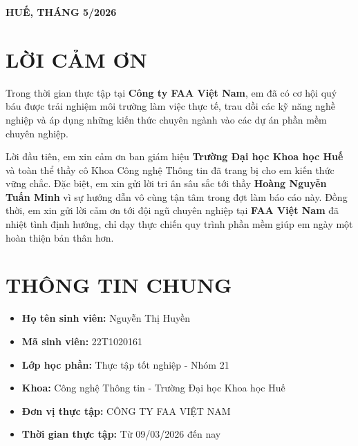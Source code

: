 \documentclass[12pt, a4paper]{article}
\begin{document}
\begin{titlepage}
    \vfill
    \begin{center}
        \textbf{HUẾ, THÁNG 5/2026}
    \end{center}
    \restoregeometry
\end{titlepage}

\newpage

\section*{LỜI CẢM ƠN}
Trong thời gian thực tập tại \textbf{Công ty FAA Việt Nam}, em đã có cơ hội quý báu được trải nghiệm môi trường làm việc thực tế, trau dồi các kỹ năng nghề nghiệp và áp dụng những kiến thức chuyên ngành vào các dự án phần mềm chuyên nghiệp. 

Lời đầu tiên, em xin cảm ơn ban giám hiệu \textbf{Trường Đại học Khoa học Huế} và toàn thể thầy cô Khoa Công nghệ Thông tin đã trang bị cho em kiến thức vững chắc. Đặc biệt, em xin gửi lời tri ân sâu sắc tới thầy \textbf{Hoàng Nguyễn Tuấn Minh} vì sự hướng dẫn vô cùng tận tâm trong đợt làm báo cáo này. Đồng thời, em xin gửi lời cảm ơn tới đội ngũ chuyên nghiệp tại \textbf{FAA Việt Nam} đã nhiệt tình định hướng, chỉ dạy thực chiến quy trình phần mềm giúp em ngày một hoàn thiện bản thân hơn.

\newpage
\renewcommand{\contentsname}{MỤC LỤC}
\tableofcontents
\newpage


\section{THÔNG TIN CHUNG}
\begin{itemize}
    \item \textbf{Họ tên sinh viên:} Nguyễn Thị Huyền
    \item \textbf{Mã sinh viên:} 22T1020161
    \item \textbf{Lớp học phần:} Thực tập tốt nghiệp - Nhóm 21
    \item \textbf{Khoa:} Công nghệ Thông tin - Trường Đại học Khoa học Huế
    \item \textbf{Đơn vị thực tập:} CÔNG TY FAA VIỆT NAM
    \item \textbf{Thời gian thực tập:} Từ 09/03/2026 đến nay
\end{itemize}
\end{document}
